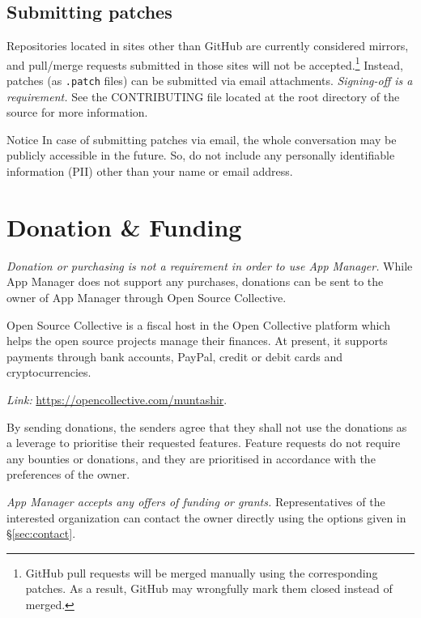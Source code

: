 \subsection{Submitting patches}\label{subsec:submitting-patches} %
Repositories located in sites other than GitHub are currently considered mirrors, and pull/merge requests submitted in
those sites will not be accepted.\footnote{GitHub pull requests will be merged manually using the corresponding patches.
As a result, GitHub may wrongfully mark them closed instead of merged.} Instead, patches (as \texttt{.patch} files) can
be submitted via email attachments. \textit{Signing-off is a requirement.} See the CONTRIBUTING file located at the root
directory of the source for more information.

\begin{warning}{Notice}
    In case of submitting patches via email, the whole conversation may be publicly accessible in the future. So, do not
    include any personally identifiable information (PII) other than your name or email address.
\end{warning}


\section{Donation \& Funding}\label{sec:donation-&-funding} %
\emph{Donation or purchasing is not a requirement in order to use App Manager.} While App Manager does not support any
purchases, donations can be sent to the owner of App Manager through Open Source Collective.

Open Source Collective is a fiscal host in the Open Collective platform which helps the open source projects manage
their finances. At present, it supports payments through bank accounts, PayPal, credit or debit cards and
cryptocurrencies.

\textit{Link:} \url{https://opencollective.com/muntashir}.

By sending donations, the senders agree that they shall not use the donations as a leverage to prioritise their
requested features. Feature requests do not require any bounties or donations, and they are prioritised in accordance
with the preferences of the owner.

\emph{App Manager accepts any offers of funding or grants.} Representatives of the interested organization can contact
the owner directly using the options given in §\cref{sec:contact}.


